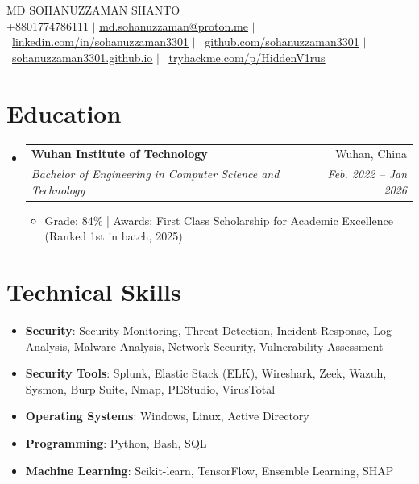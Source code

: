 \documentclass[letterpaper,11pt]{article}
\makeatletter
\newcommand{\resumeItem}[1]{
  \item\small{
    {#1 \vspace{-2pt}}
  }
}
\newcommand{\resumeSubheading}[4]{
  \vspace{-2pt}\item
    \begin{tabular*}{0.97\textwidth}[t]{l@{\extracolsep{\fill}}r}
      \textbf{#1} & #2 \\
      \textit{\small#3} & \textit{\small #4} \\
    \end{tabular*}\vspace{-7pt}
}
\newcommand{\resumeSubHeadingListStart}{\begin{itemize}[leftmargin=0.15in, label={}]}
\newcommand{\resumeSubHeadingListEnd}{\end{itemize}}
\newcommand{\resumeItemListStart}{\begin{itemize}}
\newcommand{\resumeItemListEnd}{\end{itemize}\vspace{-5pt}}
\makeatother
\begin{document}

\begin{center}
    {\Huge \textsc{MD SOHANUZZAMAN SHANTO}} \\
    \vspace{6pt}
    {\small +8801774786111 $|$ \href{mailto:md.sohanuzzaman@proton.me}{\underline{md.sohanuzzaman@proton.me}} $|$ \
    \href{https://linkedin.com/in/sohanuzzaman3301}{\underline{linkedin.com/in/sohanuzzaman3301}} $|$ \
    \href{https://github.com/sohanuzzaman3301}{\underline{github.com/sohanuzzaman3301}} $|$ \
    \href{https://sohanuzzaman3301.github.io}{\underline{sohanuzzaman3301.github.io}} $|$ \
    \href{https://tryhackme.com/p/HiddenV1rus}{\underline{tryhackme.com/p/HiddenV1rus}}}
\end{center}
\section{Education}
\resumeSubHeadingListStart
\resumeSubheading
{Wuhan Institute of Technology}{Wuhan, China}
{Bachelor of Engineering in Computer Science and Technology}{Feb. 2022 -- Jan 2026}
\resumeItemListStart
\resumeItem{Grade: 84\% | Awards: First Class Scholarship for Academic Excellence (Ranked 1st in batch, 2025)}
\resumeItemListEnd
\resumeSubHeadingListEnd
%
\section{Technical Skills}
\begin{itemize}[leftmargin=0.15in, label={}]
\small
\item{\textbf{Security}: Security Monitoring, Threat Detection, Incident Response, Log Analysis, Malware Analysis, Network Security, Vulnerability Assessment}
\item{\textbf{Security Tools}: Splunk, Elastic Stack (ELK), Wireshark, Zeek, Wazuh, Sysmon, Burp Suite, Nmap, PEStudio, VirusTotal}
\item{\textbf{Operating Systems}: Windows, Linux, Active Directory}
\item{\textbf{Programming}: Python, Bash, SQL}
\item{\textbf{Machine Learning}: Scikit-learn, TensorFlow, Ensemble Learning, SHAP}
\end{itemize}
%
\end{document}
